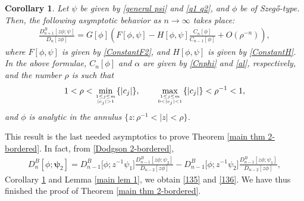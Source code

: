 \documentclass[pdftex]{sigma}
\numberwithin{equation}{section}
\newtheorem{Corollary}[Theorem]{Corollary}
\newcommand{\al}{\alpha}
\begin{document}
\begin{Corollary}\label{main cor 1}
Let $\psi$ be given by \eqref{general psi} and \eqref{q1 q2}, and $\phi$ be of Szeg\H{o}-type. Then, the following asymptotic behavior as $n \to \infty$ takes place:
			\begin{gather*}%
				\frac{D^{B}_{n+1}[z\phi;\psi]}{D_{n}[z\phi]} = G[\phi] \left( F [\phi,\psi] - H[\phi,\psi] \frac{C_n[\phi]}{C_{n-1}[\phi]} + O(\rho^{-n})\right),
			\end{gather*}
			where $F [\phi,\psi]$ is given by \eqref{ConstantF2}, and $H[\phi,\psi]$ is given by \eqref{ConstantH}.
			In the above formulae, $C_n[\phi]$ and
			$\al$ are given by \eqref{Cnphi} and \eqref{al}, respectively, and the number $\rho$ is such that
\[
1<\rho < \underset{1 \leq j \leq m \atop |c_j|>1}{\min} \{|c_j|\}, \qquad \underset{1 \leq j \leq m \atop 0<|c_j|<1}{\max} \{|c_j|\}<\rho^{-1}<1,
\]
 and $\phi$ is analytic in the annulus $\big\{z\colon \rho^{-1}<|z|<\rho\big\}$.
		\end{Corollary}
		This result is the last needed asymptotics to prove Theorem \ref{main thm 2-bordered}. In fact, from \eqref{Dodgson 2-bordered},
		\begin{gather*}%
			D^B_n[\phi;\boldsymbol{\psi}_2] = D^B_{n-1}\big[\phi;z^{-1}\psi_1\big] \frac{D^B_{n-1}[z\phi;\psi_2]}{D_{n-2}[z \phi]} - D^B_{n-1}\big[\phi;z^{-1}\psi_2\big] \frac{D^B_{n-1}[z\phi;\psi_1]}{D_{n-2}[z \phi]},
		\end{gather*}
		Corollary \ref{main cor 1} and Lemma \ref{main lem 1}, we obtain \eqref{135} and \eqref{136}. We have thus finished the proof of Theorem \ref{main thm 2-bordered}.
		
\end{document}
